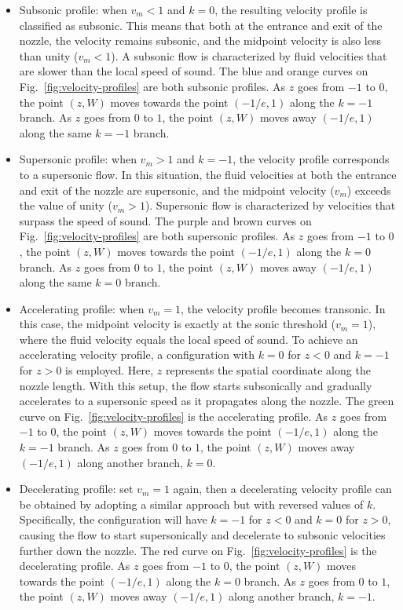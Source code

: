 \begin{itemize}
	\item Subsonic profile: when $v_m < 1$ and $k = 0$, the resulting velocity profile is classified as subsonic. This means that both at the entrance and exit of the nozzle, the velocity remains subsonic, and the midpoint velocity is also less than unity ($v_m < 1$). A subsonic flow is characterized by fluid velocities that are slower than the local speed of sound. The blue and orange curves on Fig.~\ref{fig:velocity-profiles} are both subsonic profiles. As $z$ goes from $-1$ to $0$, the point $(z,W)$ moves towards the point $(-1/e, 1)$ along the $k=-1$ branch. As $z$ goes from $0$ to $1$, the point $(z, W)$ moves away $(-1/e,1)$ along the same $k=-1$ branch.
	\item Supersonic profile: when $v_m > 1$ and $k = -1$, the velocity profile corresponds to a supersonic flow. In this situation, the fluid velocities at both the entrance and exit of the nozzle are supersonic, and the midpoint velocity ($v_m$) exceeds the value of unity ($v_m > 1$). Supersonic flow is characterized by velocities that surpass the speed of sound. The purple and brown curves on Fig.~\ref{fig:velocity-profiles} are both supersonic profiles. As $z$ goes from $-1$ to $0$, the point $(z,W)$ moves towards the point $(-1/e, 1)$ along the $k=0$ branch. As $z$ goes from $0$ to $1$, the point $(z, W)$ moves away $(-1/e,1)$ along the same $k=0$ branch.
	\item Accelerating profile: when $v_m = 1$, the velocity profile becomes transonic. In this case, the midpoint velocity is exactly at the sonic threshold ($v_m = 1$), where the fluid velocity equals the local speed of sound. To achieve an accelerating velocity profile, a configuration with $k = 0$ for $z < 0$ and $k = -1$ for $z > 0$ is employed. Here, $z$ represents the spatial coordinate along the nozzle length. With this setup, the flow starts subsonically and gradually accelerates to a supersonic speed as it propagates along the nozzle. The green curve on Fig.~\ref{fig:velocity-profiles} is the accelerating profile. As $z$ goes from $-1$ to $0$, the point $(z,W)$ moves towards the point $(-1/e, 1)$ along the $k=-1$ branch. As $z$ goes from $0$ to $1$, the point $(z, W)$ moves away $(-1/e,1)$ along another branch, $k=0$.
	\item Decelerating profile: set $v_m = 1$ again, then a decelerating velocity profile can be obtained by adopting a similar approach but with reversed values of $k$. Specifically, the configuration will have $k = -1$ for $z < 0$ and $k = 0$ for $z > 0$, causing the flow to start supersonically and decelerate to subsonic velocities further down the nozzle. The red curve on Fig.~\ref{fig:velocity-profiles} is the decelerating profile. As $z$ goes from $-1$ to $0$, the point $(z,W)$ moves towards the point $(-1/e, 1)$ along the $k=0$ branch. As $z$ goes from $0$ to $1$, the point $(z, W)$ moves away $(-1/e,1)$ along another branch, $k=-1$.
\end{itemize}


